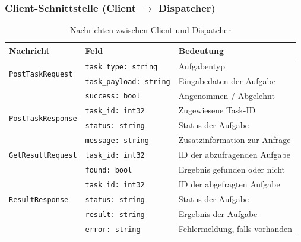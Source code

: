 \subsubsection*{Client-Schnittstelle (Client $\rightarrow$ Dispatcher)}

\begin{table}[H]
	\centering
	\begin{tabular}{m{4cm} m{5cm} m{6.5cm}}
		\toprule
		\textbf{Nachricht} & \textbf{Feld} & \textbf{Bedeutung} \\
		\midrule
		\multirow{2}{*}{\texttt{PostTaskRequest}} 
		& \texttt{task\_type: string} & Aufgabentyp \\
		& \texttt{task\_payload: string} & Eingabedaten der Aufgabe \\
		\midrule
		\multirow{4}{*}{\texttt{PostTaskResponse}} 
		& \texttt{success: bool} & Angenommen / Abgelehnt \\
		& \texttt{task\_id: int32} & Zugewiesene Task-ID \\
		& \texttt{status: string} & Status der Aufgabe \\
		& \texttt{message: string} & Zusatzinformation zur Anfrage \\
		\midrule
		\multirow{1}{*}{\texttt{GetResultRequest}} 
		& \texttt{task\_id: int32} & ID der abzufragenden Aufgabe \\
		\midrule
		\multirow{5}{*}{\texttt{ResultResponse}} 
		& \texttt{found: bool} & Ergebnis gefunden oder nicht \\
		& \texttt{task\_id: int32} & ID der abgefragten Aufgabe \\
		& \texttt{status: string} & Status der Aufgabe \\
		& \texttt{result: string} & Ergebnis der Aufgabe \\
		& \texttt{error: string} & Fehlermeldung, falls vorhanden \\
		\bottomrule
	\end{tabular}
	\caption{Nachrichten zwischen Client und Dispatcher}
\end{table}


